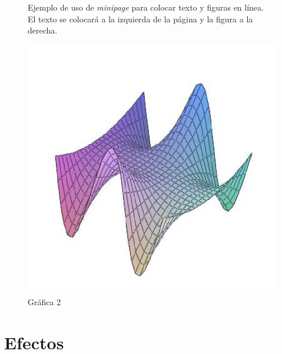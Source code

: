 \documentclass[letterpaper,12pt]{article}
\begin{document}
\begin{figure}[h!]
	\begin{minipage}{0.5\textwidth} %
		Ejemplo de uso de \emph{minipage} para colocar texto y figuras en línea.\\
		El texto se colocará a la izquierda de la página y la figura a la derecha.
	\end{minipage}
	\begin{minipage}{0.4\textwidth} %
		\centering
		\includegraphics[scale=0.2]{grafica10.jpg}
		\caption{Gráfica 2}
	\end{minipage}
\end{figure}

\newpage

\section{Efectos}
\end{document}
